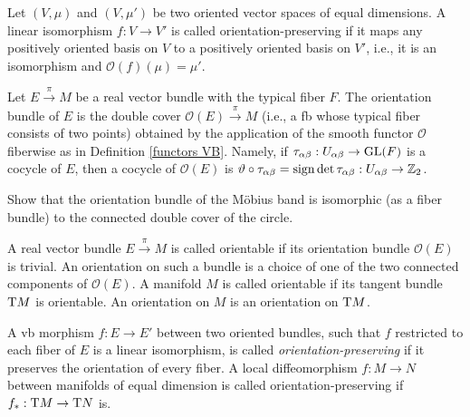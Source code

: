 \begin{defn}
    Let $(V,\mu)$ and $(V,\mu')$ be two oriented vector spaces of equal dimensions. A linear isomorphism $f:V\to V'$ is called orientation-preserving if it maps any positively oriented basis on $V$ to a positively oriented basis on $V'$, i.e., it is an isomorphism and $\mathcal{O}(f)(\mu)=\mu'$.
\end{defn}


\begin{defn}
    Let $E\overset\pi\to M$ be a real vector bundle with the typical fiber $F$. The orientation bundle of $E$ is the double cover $\mathcal{O}(E)\overset{\pi}\to M$ (i.e., a \gls{fb} whose typical fiber consists of two points) obtained by the application of the smooth functor $\mathcal{O}$ fiberwise as in Definition \ref{functors VB}. Namely, if $\tau_{\alpha\beta}:U_{\alpha\beta}\to\operatorname{GL}(F)$ is a cocycle of $E$, then a cocycle of $\mathcal{O}(E)$ is $\vartheta\circ\tau_{\alpha\beta}=\operatorname{sign}\det\tau_{\alpha\beta}:U_{\alpha\beta}\to\mathbb{Z}_2$.
\end{defn}

\begin{xca}
    Show that the orientation bundle of the M\"obius band is isomorphic (as a fiber bundle) to the connected double cover of the circle.
\end{xca}

\begin{defn}
    A real vector bundle $E\overset\pi\to M$ is called orientable if its orientation bundle $\mathcal{O}(E)$ is trivial. An orientation on such a bundle is a choice of one of the two connected components of $\mathcal{O}(E)$. A manifold $M$ is called orientable if its tangent bundle $\mathrm{T} M$ is orientable. An orientation on $M$ is an orientation on $\mathrm{T} M$.

    A \gls{vb} morphism $f:E\to E'$ between two oriented bundles, such that $f$ restricted to each fiber of $E$ is a linear isomorphism, is called \emph{orientation-preserving} if it preserves the orientation of every fiber. A local diffeomorphism $f:M\to N$ between manifolds of equal dimension is called orientation-preserving if $f_\ast:\mathrm{T} M\to \mathrm{T} N$ is.
\end{defn}

